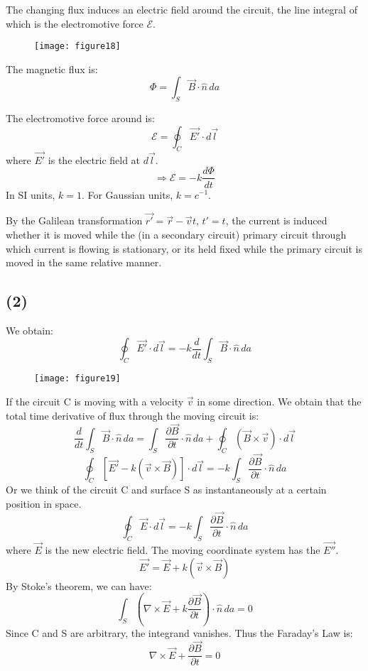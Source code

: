 \documentclass{article}
\begin{document}
	\vspace{1em}
	The changing flux induces an electric field around the circuit, the line integral of which is the electromotive force $\mathcal{E}$. 
	
	
	\begin{figure}[h]
		\centering
		\texttt{[image: figure18]}
		\caption{}
		\label{fig:figure18}
	\end{figure}
	
	The magnetic flux is:
	$$ \Phi = \int_S \vec{B} \cdot \hat{n} \, da $$
	
	The electromotive force around is:
	$$ \mathcal{E} = \oint_C \vec{E'} \cdot d\vec{l} $$
	where $\vec{E'}$ is the electric field at $d\vec{l}$.
	$$ \Rightarrow \mathcal{E} = -k \frac{d\Phi}{dt} $$
	In SI units, $k=1$. For Gaussian units, $k=c^{-1}$.
	
	\vspace{1em}
	By the Galilean transformation $\vec{r'} = \vec{r} - \vec{v}t$, $t'=t$, the current is induced whether it is moved while the (in a secondary circuit) primary circuit through which current is flowing is stationary, or its held fixed while the primary circuit is moved in the same relative manner.
	
	\subsection*{(2)}
	We obtain:
	$$ \oint_C \vec{E'} \cdot d\vec{l} = -k \frac{d}{dt} \int_S \vec{B} \cdot \hat{n} \, da $$
	
	\begin{figure}[h]
		\centering
		\texttt{[image: figure19]}
		\caption{}
		\label{fig:figure19}
	\end{figure}
	If the circuit C is moving with a velocity $\vec{v}$ in some direction. We obtain that the total time derivative of flux through the moving circuit is:
	$$ \frac{d}{dt} \int_S \vec{B} \cdot \hat{n} \, da = \int_S \frac{\partial\vec{B}}{\partial t} \cdot \hat{n} \, da + \oint_C (\vec{B} \times \vec{v}) \cdot d\vec{l} $$
	$$ \oint_C [\vec{E'} - k(\vec{v} \times \vec{B})] \cdot d\vec{l} = -k \int_S \frac{\partial\vec{B}}{\partial t} \cdot \hat{n} \, da $$
	Or we think of the circuit C and surface S as instantaneously at a certain position in space.
	$$ \oint_C \vec{E} \cdot d\vec{l} = -k \int_S \frac{\partial\vec{B}}{\partial t} \cdot \hat{n} \, da $$
	where $\vec{E}$ is the new electric field. The moving coordinate system has the $\vec{E''}$.
	$$ \vec{E'} = \vec{E} + k(\vec{v} \times \vec{B}) $$
	By Stoke's theorem, we can have:
	$$ \int_S (\nabla \times \vec{E} + k \frac{\partial\vec{B}}{\partial t}) \cdot \hat{n} \, da = 0 $$
	Since C and S are arbitrary, the integrand vanishes. Thus the Faraday's Law is:
	$$ \nabla \times \vec{E} + \frac{\partial\vec{B}}{\partial t} = 0 $$
	
\end{document}
